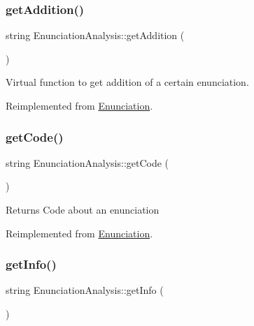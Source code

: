 \subsubsection{\texorpdfstring{get\+Addition()}{getAddition()}}
{\footnotesize\ttfamily string Enunciation\+Analysis\+::get\+Addition (\begin{DoxyParamCaption}{ }\end{DoxyParamCaption})\hspace{0.3cm}{\ttfamily [virtual]}}



Virtual function to get addition of a certain enunciation. 



Reimplemented from \hyperlink{class_enunciation_ad0bf6d8d34f6246cd5bc674b15b5958b}{Enunciation}.

\mbox{\label{class_enunciation_analysis_a8393cb5e4c7a096f09e1112dbc854cf8}} 
\subsubsection{\texorpdfstring{get\+Code()}{getCode()}}
{\footnotesize\ttfamily string Enunciation\+Analysis\+::get\+Code (\begin{DoxyParamCaption}{ }\end{DoxyParamCaption})\hspace{0.3cm}{\ttfamily [virtual]}}

\begin{DoxyReturn}{Returns}
Code about an enunciation 
\end{DoxyReturn}


Reimplemented from \hyperlink{class_enunciation_a2c27d4c83302dd7d21e1064c9e4ec97d}{Enunciation}.

\mbox{\label{class_enunciation_analysis_a6cc8894f92eecbb68a7ebeb4a8365896}} 
\subsubsection{\texorpdfstring{get\+Info()}{getInfo()}}
{\footnotesize\ttfamily string Enunciation\+Analysis\+::get\+Info (\begin{DoxyParamCaption}{ }\end{DoxyParamCaption})\hspace{0.3cm}{\ttfamily [virtual]}}

